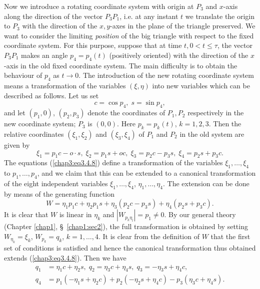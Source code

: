 Now we introduce a rotating coordinate system with origin at $P_3$ and
$x$-axis along the direction of the vector $P_3 P_1$, i.e. at any
instant $t$ we translate the origin to $P_3$ with the direction of the
$x,y$-axes in the plane of the triangle preserved. We want to consider
the limiting {\em position} of the big triangle with respect to the
fixed coordinate system. For this purpose, suppose that at time $t, 0
< t \leq \tau$, the vector $P_3 P_1$ makes an angle $p_4 = p_4 (t)$
(positively oriented) with the direction 
 of the $x$-axis in the old fixed coordinate system. The main
 difficulty is to obtain the behaviour of $p_4$ as $t \to 0$. The
 introduction of the new rotating coordinate system means a
 transformation of the variables $(\xi, \eta)$ into new variables
 which can be described as follows. Let us set  
\begin{equation*}
c = \cos p_4, \; s = \sin p_4, \tag{3.4.7}\label{chap3:eq3.4.7}
\end{equation*}\pageoriginale
and let $(p_1, 0)$, $(p_2, p_3)$ denote the coordinates of $P_1, P_2$
respectively in the new coordinate system; $P_3$ is $(0,0)$. Here $p_k
= p_k (t)$, $k=1, 2,3$. Then the relative coordinates $(\xi_1, \xi_2)$
and $(\xi_3, \xi_4)$ of $P_1$ and $P_2$ in the old system are given by 
\begin{equation*}
\xi_1 = p_1 c - o \cdot s, \; \xi_2 = p_1  s+ oc, \; \xi_3 = p_2 c -
p_3 s, \; \xi_4 = p_2 s + p_3 c.\tag{3.4.8}\label{chap3:eq3.4.8} 
\end{equation*}
The equations (\ref{chap3:eq3.4.8}) define a transformation of the
variables $\xi_1, \ldots, \xi_4$ to $p_1, \ldots, p_4$, and we claim
that this can be extended to a canonical transformation of the eight
independent variables $\xi_1, \ldots, \xi_4$, $\eta_1 , \ldots,
\eta_4$. The extension can be done by means of the generating function 
\begin{equation*}
W = \eta_1 p_1 c + \eta_2 p_1 s + \eta_3 (p_2 c - p_3 s) + \eta_4 (p_2
s + p_3 c). \tag{3.4.9}\label{chap3:eq3.4.9} 
\end{equation*}
It is clear that $W$ is linear in $\eta_k$ and $|W_{p_k \eta_l}| = p_1
\neq 0$. By our general theory (Chapter \ref{chap1},
\S\ \ref{chap1:sec2}), the full transformation is obtained by setting
$W_{\eta_k} = \xi_k$, $W_{p_k} = q_k$, $k =1, \ldots, 4$. It is clear
from the definition of $W$ that the first set of conditions is
satisfied and hence the canonical transformation thus obtained extends
(\ref{chap3:eq3.4.8}). Then we have 
\begin{align*}
q_1 & = \eta_1 c + \eta_2 s, \; q_2 = \eta_3 c + \eta_4 s, \; q_3 = -
\eta_3 s + \eta_4 c, \\ 
q_4 & = p_1 (-\eta_1 s + \eta_2 c) + p_2 (-\eta_2 s + \eta_4 c) -
p_3(\eta_3 c + \eta_4 s). \tag{3.4.10}\label{chap3:eq3.4.10} 
\end{align*}

